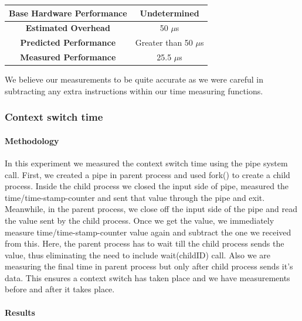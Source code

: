 \documentclass[conference]{IEEEtran}
\begin{document}
\begin{center}
\begin{tabular}{ |c|c| } 
  \hline
  \textbf{Base Hardware Performance} & Undetermined \\ 
  \hline
  \textbf{Estimated Overhead} &  50 $\mu$s \\ 
  \hline
  \textbf{Predicted Performance} & Greater than 50 $\mu$s \\ 
  \hline
  \textbf{Measured Performance} & 25.5 $\mu$s \\ 
  \hline
\end{tabular}
\end{center}

We believe our measurements to be quite accurate as we were careful in subtracting any extra instructions within our time measuring functions.



\subsubsection{Context switch time}

\paragraph{Methodology}

In this experiment we measured the context switch time using the pipe system call.
First, we created a pipe in parent process and used fork() to create a child process. Inside the child process we closed the input side of pipe, measured the time/time-stamp-counter and sent that value through the pipe and exit. Meanwhile, in the parent process, we close off the input side of the pipe and read the value sent by the child process. Once we get the value, we immediately measure time/time-stamp-counter value again and subtract the one we received from this. 
Here, the parent process has to wait till the child process sends the value, thus eliminating the need to include wait(childID) call. Also we are measuring the final time in parent process but only after child process sends it's data. This ensures a context switch has taken place and we have measurements before and after it takes place.

\paragraph{Results}
\end{document}
